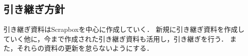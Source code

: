 \subsection*{引き継ぎ方針}


引き継ぎ資料はScrapboxを中心に作成していく．
新規に引き継ぎ資料を作成していく他に，今まで作成された引き継ぎ資料も活用し，引き継ぎを行う．
また，それらの資料の更新を怠らないようにする．
